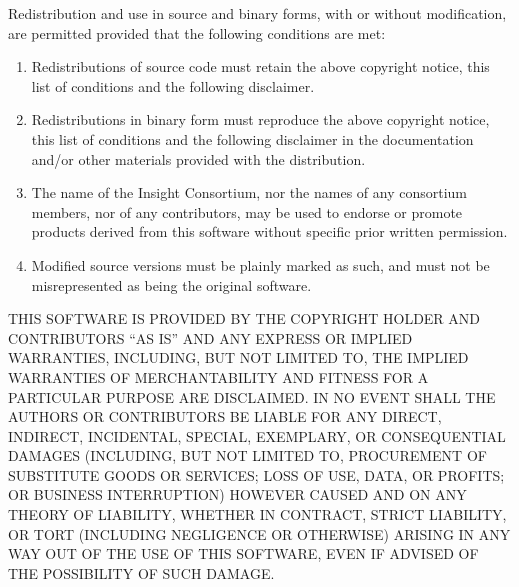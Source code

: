 \centerline{}

Redistribution and use in source and binary forms, with or without
modification, are permitted provided that the following conditions are met:

\begin{enumerate}
\item
Redistributions of source code must retain the above copyright notice,
this list of conditions and the following disclaimer.

\item
Redistributions in binary form must reproduce the above copyright notice,
this list of conditions and the following disclaimer in the documentation
and/or other materials provided with the distribution.

\item
The name of the Insight Consortium, nor the names of any consortium members,
nor of any contributors, may be used to endorse or promote products derived
from this software without specific prior written permission.

\item
Modified source versions must be plainly marked as such, and must not be
misrepresented as being the original software.

\end{enumerate}


THIS SOFTWARE IS PROVIDED BY THE COPYRIGHT HOLDER AND CONTRIBUTORS ``AS IS''
AND ANY EXPRESS OR IMPLIED WARRANTIES, INCLUDING, BUT NOT LIMITED TO, THE
IMPLIED WARRANTIES OF MERCHANTABILITY AND FITNESS FOR A PARTICULAR PURPOSE
ARE DISCLAIMED. IN NO EVENT SHALL THE AUTHORS OR CONTRIBUTORS BE LIABLE FOR
ANY DIRECT, INDIRECT, INCIDENTAL, SPECIAL, EXEMPLARY, OR CONSEQUENTIAL
DAMAGES (INCLUDING, BUT NOT LIMITED TO, PROCUREMENT OF SUBSTITUTE GOODS OR
SERVICES; LOSS OF USE, DATA, OR PROFITS; OR BUSINESS INTERRUPTION) HOWEVER
CAUSED AND ON ANY THEORY OF LIABILITY, WHETHER IN CONTRACT, STRICT LIABILITY,
OR TORT (INCLUDING NEGLIGENCE OR OTHERWISE) ARISING IN ANY WAY OUT OF THE USE
OF THIS SOFTWARE, EVEN IF ADVISED OF THE POSSIBILITY OF SUCH DAMAGE.


